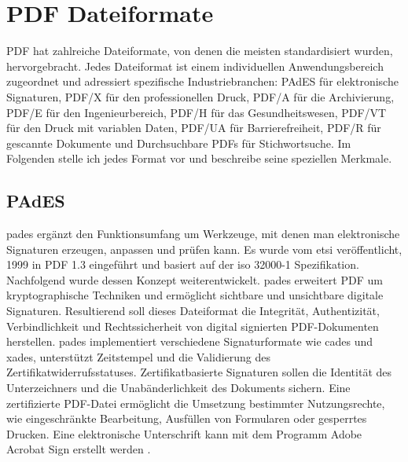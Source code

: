 \section{PDF Dateiformate}
PDF hat zahlreiche Dateiformate, von denen die meisten standardisiert wurden, hervorgebracht. Jedes Dateiformat ist einem individuellen Anwendungsbereich zugeordnet und adressiert spezifische Industriebranchen: PAdES für elektronische Signaturen, PDF/X für den professionellen Druck, PDF/A für die Archivierung, PDF/E für den Ingenieurbereich, PDF/H für das Gesundheitswesen, PDF/VT für den Druck mit variablen Daten, PDF/UA für Barrierefreiheit, PDF/R für gescannte Dokumente und Durchsuchbare PDFs für Stichwortsuche. Im Folgenden stelle ich jedes Format vor und beschreibe seine speziellen Merkmale. 

\subsection{PAdES}
\gls{pades} ergänzt den Funktionsumfang um Werkzeuge, mit denen man elektronische Signaturen erzeugen, anpassen und prüfen kann. Es wurde vom \gls{etsi} veröffentlicht, 1999 in PDF 1.3 eingeführt und basiert auf der \gls{iso} 32000-1 Spezifikation. Nachfolgend wurde dessen Konzept weiterentwickelt. \gls{pades} erweitert PDF um kryptographische Techniken und ermöglicht sichtbare und unsichtbare digitale Signaturen. Resultierend soll dieses Dateiformat die Integrität, Authentizität, Verbindlichkeit und Rechtssicherheit von digital signierten PDF-Dokumenten herstellen. \gls{pades} implementiert verschiedene Signaturformate wie \gls{cades} und \gls{xades}, unterstützt Zeitstempel und die Validierung des Zertifikatwiderrufsstatuses. Zertifikatbasierte Signaturen sollen die Identität des Unterzeichners und die Unabänderlichkeit des Dokuments sichern. Eine zertifizierte PDF-Datei ermöglicht die Umsetzung bestimmter Nutzungsrechte, wie eingeschränkte Bearbeitung, Ausfüllen von Formularen oder gesperrtes Drucken. Eine elektronische Unterschrift kann mit dem Programm Adobe Acrobat Sign erstellt werden \cite{adobe-pdf-pades}. 

